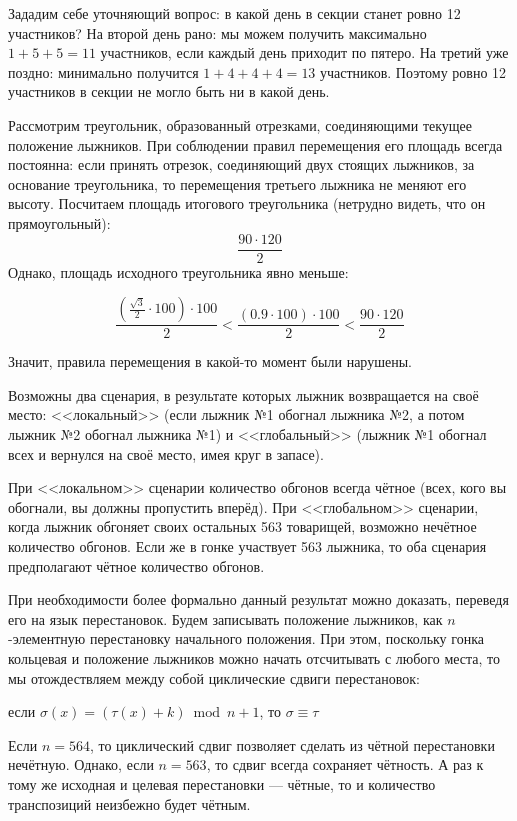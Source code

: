 \begin{itemize}
\itA Зададим себе уточняющий вопрос: в какой день в секции станет ровно 12 участников?
На второй день рано: мы можем получить максимально $1+5+5=11$ участников, если каждый день приходит по пятеро.
На третий уже поздно: минимально получится $1+4+4+4=13$ участников. 
Поэтому ровно 12 участников в секции не могло быть ни в какой день.

\itB Рассмотрим треугольник, образованный отрезками, соединяющими текущее положение лыжников.
При соблюдении правил перемещения его площадь всегда постоянна: если принять
отрезок, соединяющий двух стоящих лыжников, за основание треугольника, 
то перемещения третьего лыжника не меняют его высоту.
Посчитаем площадь итогового треугольника (нетрудно видеть, что он прямоугольный): $$\frac{90\cdot 120}{2}$$
Однако, площадь исходного треугольника явно меньше:

$$\frac{\left(\frac{\sqrt{3}}{2}\cdot 100\right) \cdot 100}{2} < \frac{(0.9 \cdot 100) \cdot 100}{2} < \frac{90 \cdot 120}{2}$$

Значит, правила перемещения в какой-то момент были нарушены.

\itC Возможны два сценария, в результате которых лыжник возвращается на своё место: <<локальный>> 
(если лыжник №1 обогнал лыжника №2, а потом лыжник №2 обогнал лыжника №1) и <<глобальный>>
(лыжник №1 обогнал всех и вернулся на своё место, имея круг в запасе).

При <<локальном>> сценарии количество обгонов всегда чётное (всех, кого вы обогнали, вы должны пропустить вперёд).
При <<глобальном>> сценарии, когда лыжник обгоняет своих остальных 563 товарищей, возможно нечётное
количество обгонов.
Если же в гонке участвует 563 лыжника, то оба сценария предполагают чётное количество обгонов.

При необходимости 
более формально данный результат можно доказать, переведя его на язык перестановок. 
Будем записывать положение лыжников, как $n$-элементную перестановку начального 
положения. 
При этом, поскольку гонка кольцевая и положение лыжников
можно начать отсчитывать с любого места, то мы отождествляем между собой циклические
сдвиги перестановок: 
\begin{center}если $\sigma(x) = (\tau(x)+k) \bmod n + 1$, то $\sigma \equiv \tau$
\end{center}

Если $n = 564$, то циклический сдвиг позволяет сделать из чётной перестановки
нечётную. Однако, если $n=563$, то сдвиг всегда сохраняет чётность.
А раз к тому же исходная и целевая перестановки --- чётные, то и количество транспозиций неизбежно будет чётным. 

\end{itemize}
